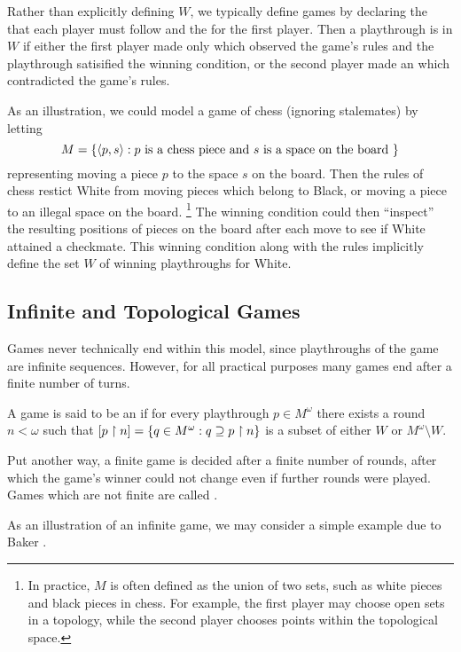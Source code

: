 Rather than explicitly defining $W$, we 
typically define games by declaring the  that each player must 
follow and the  for the first player. 
Then a playthrough is in $W$ if either 
the first player made only  which observed the game's rules
and the playthrough satisified the winning condition, or the second player
made an  which contradicted the game's rules.

As an illustration, we could model a game of chess (ignoring stalemates) 
by letting
\[
  M = \{\langle p,s\rangle: p \text{ is a chess piece and } 
                 s \text{ is a space on the board } \}
\]
representing moving a piece $p$ to the space $s$ on the board. Then the
rules of chess restict White from moving pieces which belong to
Black, or moving a piece to an illegal space on the board. 
\footnote{
  In practice, $M$ is often defined as the union of two sets, such
  as white pieces and black pieces in chess. For example,
  the first player may choose open sets in a topology, while the second player
  chooses points within the topological space.
}
The winning condition could then
``inspect'' the resulting positions of pieces on the board after each move 
to see if White attained a
checkmate. This winning condition along with the rules implicitly define the 
set $W$ of winning playthroughs for White.


\subsection{Infinite and Topological Games}

Games never technically end within this model, since 
playthroughs of the game are infinite sequences. However, for all practical
purposes many games end after a finite number of turns.

\begin{defn}
  A game is said to be an  if for every playthrough
  $p\in M^\omega$ there exists a round $n<\omega$ such that
    $ 
      [p\restriction n] = \{q\in M^\omega : q\supseteq p\restriction n \}
    $
  is a subset of either $W$ or $M^\omega\setminus W$.
\end{defn}

Put another way, a finite game is decided after a finite number
of rounds, after which the game's winner could not change even if further
rounds were played.
Games which are not finite are called . 

As an illustration of an infinite game, we may consider a simple example due to 
Baker \cite{baker}. 

